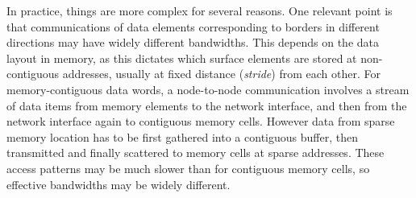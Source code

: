 \documentclass{elsarticle}
\begin{document}
In practice, things are more complex for several reasons. 
%
One relevant point is that communications of data elements corresponding to 
borders in different directions may have widely different bandwidths. 
%
This depends on the data layout in memory, as this dictates which surface elements 
are stored at non-contiguous addresses, usually at fixed distance 
({\em stride}) from each other. 
%
For memory-contiguous data words, a node-to-node communication involves a stream of
data items from memory elements to the network interface, and then from the
network interface again to contiguous memory cells. 
%
However data from sparse memory location has to be first gathered into a contiguous 
buffer, then transmitted and finally scattered to memory cells at sparse addresses. 
%
These access patterns may be much slower than for contiguous memory cells, so 
effective bandwidths may be widely different. 
\end{document}
